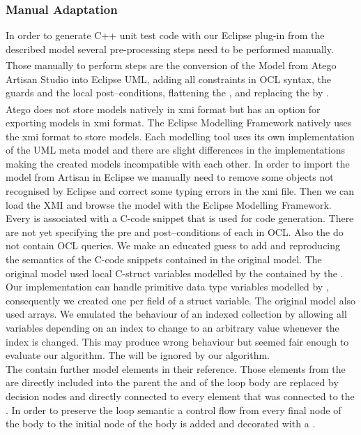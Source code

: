 \subsubsection{Manual Adaptation}
In order to generate C++ unit test code with our Eclipse plug-in from the described model several pre-processing steps need to be performed manually. Those manually to perform steps are the conversion of the Model from Atego\textsuperscript{\textregistered } Artisan Studio into Eclipse UML, adding all constraints in OCL syntax, the guards and the local post--conditions, flattening the , and replacing the  by .\\
Atego\textsuperscript{\textregistered} does not store models natively in xmi format but has an option for exporting models in xmi format. The Eclipse Modelling Framework natively uses the xmi format to store models. Each modelling tool uses its own implementation of the UML meta model and there are slight differences in the implementations making the created models incompatible with each other. In order to import the model from Artisan in Eclipse we manually need to remove some objects not recognised by Eclipse and correct some typing errors in the xmi file. Then we can load the XMI and browse the model with the Eclipse Modelling Framework.\\
Every  is associated with a C-code snippet that is used for code generation. There are not yet  specifying the pre and post--conditions of each  in OCL. Also the  do not contain OCL queries. We make an educated guess to add  and  reproducing the semantics of the C-code snippets contained in the original model. The original model used local C-struct variables modelled by the  contained by the . Our implementation can handle primitive data type variables modelled by , consequently we created one  per field of a struct variable. The original model also used arrays. We emulated the behaviour of an indexed collection by allowing all variables depending on an index to change to an arbitrary value whenever the index is changed. This may produce wrong behaviour but seemed fair enough to evaluate our algorithm. The  will be ignored by our algorithm.\\
The  contain further model elements in their  reference. Those elements from the  are directly included into the parent  the  and  of the loop body are replaced by decision nodes and directly connected to every element that was connected to the . In order to preserve the loop semantic a control flow from every final node of the body to the initial node of the body is added and decorated with a .\\
